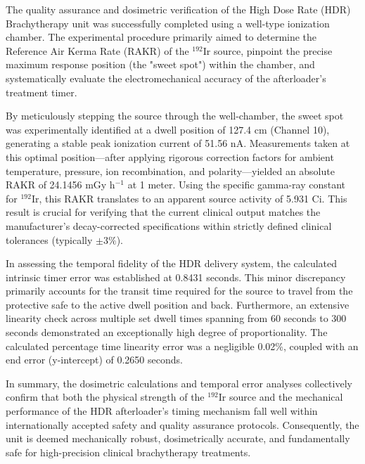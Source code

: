 The quality assurance and dosimetric verification of the High Dose Rate (HDR) Brachytherapy unit was successfully completed using a well-type ionization chamber. The experimental procedure primarily aimed to determine the Reference Air Kerma Rate (RAKR) of the $^{192}$Ir source, pinpoint the precise maximum response position (the "sweet spot") within the chamber, and systematically evaluate the electromechanical accuracy of the afterloader's treatment timer.

By meticulously stepping the source through the well-chamber, the sweet spot was experimentally identified at a dwell position of 127.4 cm (Channel 10), generating a stable peak ionization current of 51.56 nA. Measurements taken at this optimal position—after applying rigorous correction factors for ambient temperature, pressure, ion recombination, and polarity—yielded an absolute RAKR of 24.1456 mGy h$^{-1}$ at 1 meter. Using the specific gamma-ray constant for $^{192}$Ir, this RAKR translates to an apparent source activity of 5.931 Ci. This result is crucial for verifying that the current clinical output matches the manufacturer’s decay-corrected specifications within strictly defined clinical tolerances (typically $\pm 3\%$).

In assessing the temporal fidelity of the HDR delivery system, the calculated intrinsic timer error was established at 0.8431 seconds. This minor discrepancy primarily accounts for the transit time required for the source to travel from the protective safe to the active dwell position and back. Furthermore, an extensive linearity check across multiple set dwell times spanning from 60 seconds to 300 seconds demonstrated an exceptionally high degree of proportionality. The calculated percentage time linearity error was a negligible 0.02\%, coupled with an end error (y-intercept) of 0.2650 seconds. 

In summary, the dosimetric calculations and temporal error analyses collectively confirm that both the physical strength of the $^{192}$Ir source and the mechanical performance of the HDR afterloader's timing mechanism fall well within internationally accepted safety and quality assurance protocols. Consequently, the unit is deemed mechanically robust, dosimetrically accurate, and fundamentally safe for high-precision clinical brachytherapy treatments.

%
% 
%
%
